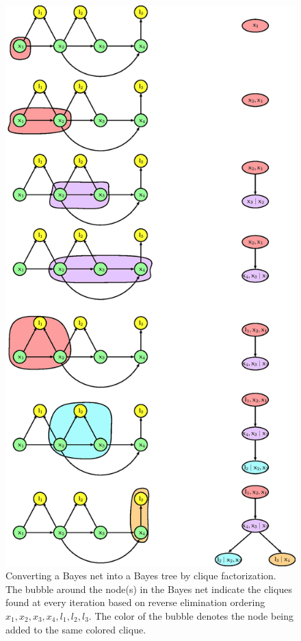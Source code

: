 \begin{figure}
\centering
\includegraphics[width=\textwidth,height=\textheight]{Chapters/figures2/from_bn_to_bt}
\caption{Converting a Bayes net into a Bayes tree by clique factorization. The bubble around the node(s) in the Bayes net indicate the cliques found at every iteration based on reverse elimination ordering $x_1, x_2, x_3, x_4, l_1, l_2, l_3$. The color of the bubble denotes the node being added to the same colored clique.}
\label{fig:bn_to_bt}
\end{figure}

